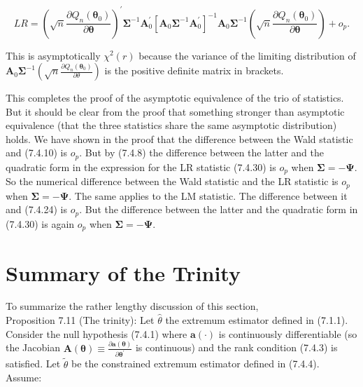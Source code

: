 \documentclass[10pt]{article}
\begin{document}
\begin{equation*}
L R=\left(\sqrt{n} \frac{\partial Q_{n}\left(\boldsymbol{\theta}_{0}\right)}{\partial \boldsymbol{\theta}}\right)^{\prime} \boldsymbol{\Sigma}^{-1} \mathbf{A}_{0}^{\prime}\left[\mathbf{A}_{0} \boldsymbol{\Sigma}^{-1} \mathbf{A}_{0}^{\prime}\right]^{-1} \mathbf{A}_{0} \boldsymbol{\Sigma}^{-1}\left(\sqrt{n} \frac{\partial Q_{n}\left(\boldsymbol{\theta}_{0}\right)}{\partial \boldsymbol{\theta}}\right)+o_{p} . \tag{7.4.30}
\end{equation*}


This is asymptotically $\chi^{2}(r)$ because the variance of the limiting distribution of $\mathbf{A}_{0} \boldsymbol{\Sigma}^{-1}\left(\sqrt{n} \frac{\partial Q_{n}\left(\boldsymbol{\theta}_{0}\right)}{\partial \theta}\right)$ is the positive definite matrix in brackets.

This completes the proof of the asymptotic equivalence of the trio of statistics. But it should be clear from the proof that something stronger than asymptotic equivalence (that the three statistics share the same asymptotic distribution) holds. We have shown in the proof that the difference between the Wald statistic and (7.4.10) is $o_{p}$. But by (7.4.8) the difference between the latter and the quadratic form in the expression for the LR statistic (7.4.30) is $o_{p}$ when $\boldsymbol{\Sigma}=\boldsymbol{-} \boldsymbol{\Psi}$. So the numerical difference between the Wald statistic and the LR statistic is $o_{p}$ when $\boldsymbol{\Sigma}=-\boldsymbol{\Psi}$. The same applies to the LM statistic. The difference between it and (7.4.24) is $o_{p}$. But the difference between the latter and the quadratic form in (7.4.30) is again $o_{p}$ when $\boldsymbol{\Sigma}=-\boldsymbol{\Psi}$.

\section*{Summary of the Trinity}
To summarize the rather lengthy discussion of this section,\\
Proposition 7.11 (The trinity): Let $\hat{\theta}$ the extremum estimator defined in (7.1.1). Consider the null hypothesis (7.4.1) where $\mathbf{a}(\cdot)$ is continuously differentiable (so the Jacobian $\mathbf{A}(\boldsymbol{\theta}) \equiv \frac{\partial \mathbf{a}(\boldsymbol{\theta})}{\partial \boldsymbol{\theta}^{\prime}}$ is continuous) and the rank condition (7.4.3) is satisfied. Let $\tilde{\theta}$ be the constrained extremum estimator defined in (7.4.4). Assume:
\end{document}
